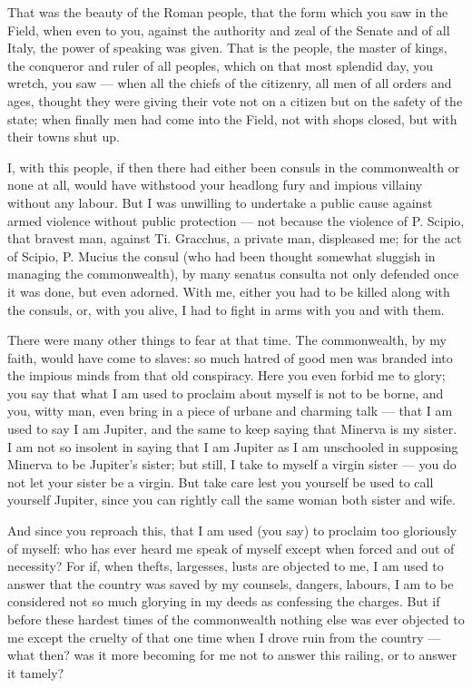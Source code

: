  That was the beauty of the Roman people, that the form which you saw in the Field, when even to you, against the authority and zeal of the Senate and of all Italy, the power of speaking was given. That is the people, the master of kings, the conqueror and ruler of all peoples, which on that most splendid day, you wretch, you saw --- when all the chiefs of the citizenry, all men of all orders and ages, thought they were giving their vote not on a citizen but on the safety of the state; when finally men had come into the Field, not with shops closed, but with their towns shut up.

 I, with this people, if then there had either been consuls in the commonwealth or none at all, would have withstood your headlong fury and impious villainy without any labour. But I was unwilling to undertake a public cause against armed violence without public protection --- not because the violence of P. Scipio, that bravest man, against Ti. Gracchus, a private man, displeased me; for the act of Scipio, P. Mucius the consul (who had been thought somewhat sluggish in managing the commonwealth), by many senatus consulta not only defended once it was done, but even adorned. With me, either you had to be killed along with the consuls, or, with you alive, I had to fight in arms with you and with them.

 There were many other things to fear at that time. The commonwealth, by my faith, would have come to slaves: so much hatred of good men was branded into the impious minds from that old conspiracy. Here you even forbid me to glory; you say that what I am used to proclaim about myself is not to be borne, and you, witty man, even bring in a piece of urbane and charming talk --- that I am used to say I am Jupiter, and the same to keep saying that Minerva is my sister. I am not so insolent in saying that I am Jupiter as I am unschooled in supposing Minerva to be Jupiter's sister; but still, I take to myself a virgin sister --- you do not let your sister be a virgin. But take care lest you yourself be used to call yourself Jupiter, since you can rightly call the same woman both sister and wife.

 And since you reproach this, that I am used (you say) to proclaim too gloriously of myself: who has ever heard me speak of myself except when forced and out of necessity? For if, when thefts, largesses, lusts are objected to me, I am used to answer that the country was saved by my counsels, dangers, labours, I am to be considered not so much glorying in my deeds as confessing the charges. But if before these hardest times of the commonwealth nothing else was ever objected to me except the cruelty of that one time when I drove ruin from the country --- what then? was it more becoming for me not to answer this railing, or to answer it tamely?

